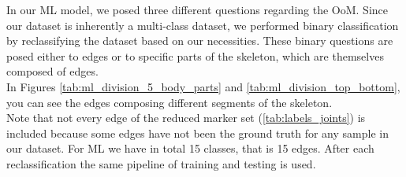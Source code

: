 In our ML model, we posed three different questions regarding the OoM. 
Since our dataset is inherently a multi-class dataset, we performed binary classification by reclassifying the dataset based on our necessities.
These binary questions are posed either to edges or to specific parts of the skeleton, which are themselves composed of edges. \\
In Figures \ref{tab:ml_division_5_body_parts} and \ref{tab:ml_division_top_bottom}, you can see the edges composing different segments of the skeleton. \\
Note that not every edge of the reduced marker set (\ref{tab:labels_joints}) is included because some edges have not been the ground truth for any sample in our dataset.
For ML we have in total 15 classes, that is 15 edges.
After each reclassification the same pipeline of training and testing is used.

